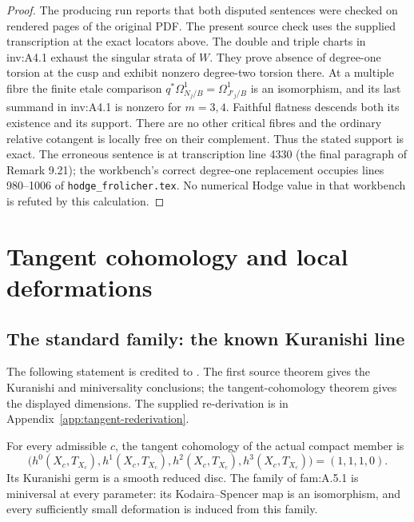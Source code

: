 \begin{proof}
The producing run reports that both disputed sentences were checked on rendered pages of the original PDF. The present source check uses the supplied transcription at the exact locators above.  The
double and triple charts in inv:A4.1 exhaust the singular strata of
$W$.  They prove absence of degree-one torsion at the cusp and
exhibit nonzero degree-two torsion there.  At a multiple fibre the
finite etale comparison
$q^*\Omega^1_{N_j/B}=\Omega^1_{J'_j/B}$ is an isomorphism,
and its last summand in inv:A4.1 is nonzero for $m=3,4$.
Faithful flatness descends both its existence and its support.
There are no other critical fibres and the ordinary relative
cotangent is locally free on their complement.  Thus the stated
support is exact.  The erroneous sentence is at transcription
line 4330 (the final paragraph of Remark 9.21); the workbench's
correct degree-one replacement occupies lines 980--1006 of
\texttt{hodge\_frolicher.tex}.  No numerical Hodge value in that
workbench is refuted by this calculation.
\end{proof}

\section{Tangent cohomology and local deformations}\label{sec:tangent}
\subsection{The standard family: the known Kuranishi line}\label{sec:tangent-known}
The following statement is credited to \cite[Theorem 1.3 and Theorem 6.12]{DGKXv1}.
The first source theorem gives the Kuranishi and miniversality conclusions;
the tangent-cohomology theorem gives the displayed dimensions.
The supplied re-derivation is in Appendix~\ref{app:tangent-rederivation}.


\begin{cited}\label{fam:A.5.2}
For every admissible $c$, the tangent cohomology of the actual compact
member is
\[
 \bigl(h^0(X_c,T_{X_c}),h^1(X_c,T_{X_c}),h^2(X_c,T_{X_c}),
 h^3(X_c,T_{X_c})\bigr)=(1,1,1,0).
\]
Its Kuranishi germ is a smooth reduced disc. The family of fam:A.5.1 is
miniversal at every parameter: its Kodaira--Spencer map is an isomorphism,
and every sufficiently small deformation is induced from this family.
\end{cited}

